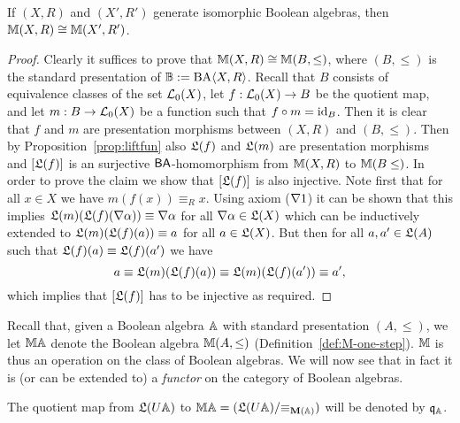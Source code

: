 \documentclass{book}
\begin{document}
\begin{proposition}
\label{p:Mwelldef}
If $(X,R)$ and $(X',R')$ generate isomorphic Boolean algebras, then 
$\mathbb{M}(X,R) \cong \mathbb{M}(X',R')$.
\end{proposition}
\xxviproofspace
\begin{proof}
   Clearly it suffices to prove that $\mathbb{M}(X,R) \cong \mathbb{M}(B,\leq)$, where
$(B,\leq)$
is the standard presentation of $\mathbb{B} := \mathrm{BA}\langle X, R \rangle$. 
Recall that $B$ consists of equivalence classes of the set
$\mathcal{L}_{0}(X)$, 
let $f: \mathcal{L}_{0}(X) \to B$ be the quotient map,
and let
$m: B \to \mathcal{L}_0(X)$ be a function such that 
$f \circ m = {\mathrm{id}}_B$. 
Then it is clear that 
$f$ and $m$ are presentation morphisms between $(X,R)$ 
and $(B,\leq)$. Then by Proposition~\ref{prop:liftfun}
also $\mathfrak{L}(f)$ and $\mathfrak{L}(m)$ are 
presentation morphisms and $[\mathfrak{L}(f)]$ is
an surjective $\mathsf{BA}$-homomorphism from
$\mathbb{M}(X,R)$ to $\mathbb{M}(B\leq)$. In order to prove the claim
we show that $[\mathfrak{L}(f)]$ is also injective.
Note first that for all $x \in X$
we have $m(f(x)) \equiv_R x$. Using axiom ($\nabla 1$)
it can be shown that this implies $\mathfrak{L}(m)(\mathfrak{L}(f)(\nabla \alpha))
\equiv \nabla \alpha$ for all $\nabla \alpha \in \mathfrak{L}(X)$ which can
be inductively extended to $\mathfrak{L}(m)(\mathfrak{L}(f)(a)) \equiv a$
for all $a \in \mathfrak{L}(X)$. But then for all $a,a' \in \mathfrak{L}(A)$
such that $\mathfrak{L}(f)(a) \equiv \mathfrak{L}(f)(a')$ we have
\[
	a \equiv \mathfrak{L}(m)(\mathfrak{L}(f)(a)) \equiv
	\mathfrak{L}(m)(\mathfrak{L}(f)(a')) \equiv a',
\]
which implies that $[\mathfrak{L}(f)]$ has to be injective
as required.
\end{proof}


Recall that, given a Boolean algebra $\mathbb{A}$ with standard presentation
$(A,{\leq})$, we let $\mathbb{M}\mathbb{A}$ denote the Boolean algebra
$\mathbb{M}(A,{\leq})$
(Definition~\ref{def:M-one-step}).
$\mathbb{M}$ is thus an operation on the class of Boolean algebras. 
We will now see that in fact it is (or can be extended to) a
\emph{functor} on
the category of Boolean algebras.

\begin{definition}  
The quotient map from $\mathfrak{L}(U\mathbb{A})$ to
$\mathbb{M}\mathbb{A} = (\mathfrak{L}(U\mathbb{A})/{\equiv_{\mathbf{M}(\mathbb{A})}})$
will be denoted by $\mathfrak{q}_{\mathbb{A}}$.
\end{definition}
\end{document}
